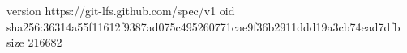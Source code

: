 version https://git-lfs.github.com/spec/v1
oid sha256:36314a55f11612f9387ad075c495260771cae9f36b2911ddd19a3cb74ead7dfb
size 216682

